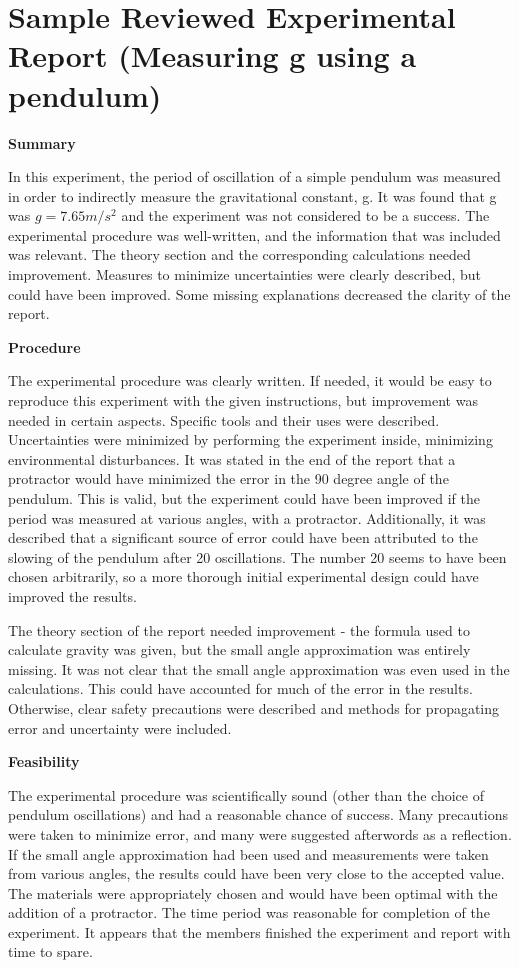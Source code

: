  \vspace{0.25cm}
\section{Sample Reviewed Experimental Report (Measuring g using a pendulum)}
 \vspace{0.25cm}
\textbf{Summary}

In this experiment, the period of oscillation of a simple pendulum was measured in order to indirectly measure the gravitational constant, g. It was found that g was $g=7.65 m/s^2$ and the experiment was not considered to be a success. The experimental procedure was well-written, and the information that was included was relevant. The theory section and the corresponding calculations needed improvement. Measures to minimize uncertainties were clearly described, but could have been improved. Some missing explanations decreased the clarity of the report.

\textbf{Procedure}

The experimental procedure was clearly written. If needed, it would be easy to reproduce this experiment with the given instructions, but improvement was needed in certain aspects. Specific tools and their uses were described. Uncertainties were minimized by performing the experiment inside, minimizing environmental disturbances. It was stated in the end of the report that a protractor would have minimized the error in the 90 degree angle of the pendulum. This is valid, but the experiment could have been improved if the period was measured at various angles, with a protractor. Additionally, it was described that a significant source of error could have been attributed to the slowing of the pendulum after 20 oscillations. The number 20 seems to have been chosen arbitrarily, so a more thorough initial experimental design could have improved the results. 

The theory section of the report needed improvement - the formula used to calculate gravity was given, but the small angle approximation was entirely missing. It was not clear that the small angle approximation was even used in the calculations. This could have accounted for much of the error in the results. Otherwise, clear safety precautions were described and methods for propagating error and uncertainty were included.

\textbf{Feasibility}

The experimental procedure was scientifically sound (other than the choice of pendulum oscillations) and had a reasonable chance of success. Many precautions were taken to minimize error, and many were suggested afterwords as a reflection. If the small angle approximation had been used and measurements were taken from various angles, the results could have been very close to the accepted value. The materials were appropriately chosen and would have been optimal with the addition of a protractor. The time period was reasonable for completion of the experiment. It appears that the members finished the experiment and report with time to spare. 

